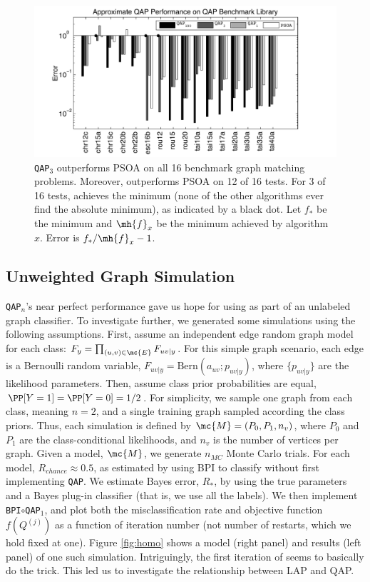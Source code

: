 \documentclass[10pt,journal,cspaper,compsoc]{IEEEtran}
\begin{document}
\begin{figure}[htbp]
	\centering			
	\includegraphics[width=1.0\linewidth]{../figs/benchmarks.pdf}
	\caption{\texttt{QAP}$_3$ outperforms PSOA on all 16 benchmark graph matching problems.  Moreover, \qapa outperforms PSOA on 12 of 16 tests.  For 3 of 16 tests, \qapb achieves the minimum (none of the other algorithms ever find the absolute minimum), as indicated by a black dot.  Let $f_*$ be the minimum and $\mh{f}_x$ be the minimum achieved by algorithm $x$.  Error is $f_*/\mh{f}_x-1$.  }
	\label{fig:fwpath}
\end{figure}




\subsection{Unweighted Graph Simulation}

\texttt{QAP}$_n$'s near perfect performance gave us hope for using \qap as part of an unlabeled graph classifier.  To investigate further, we generated some simulations using the following assumptions.  First, assume an independent edge random graph model for each class: $F_y=\prod_{(u,v) \in \mc{E}} F_{uv|y}$.  For this simple graph scenario, each edge is a Bernoulli random variable, $F_{uv|y}=\text{Bern}(a_{uv}; p_{uv|y})$, where $\{p_{uv|y}\}$ are the likelihood parameters.  Then, assume class prior probabilities are equal, $\PP[Y=1]=\PP[Y=0]=1/2$.  For simplicity, we sample one graph from each class, meaning $n=2$, and a single training graph sampled according the class priors. Thus, each simulation is defined by $\mc{M}=(P_0,P_1,n_v)$, where $P_0$ and $P_1$ are the class-conditional likelihoods, and $n_v$ is the number of vertices per graph.  Given a model, $\mc{M}$, we generate $n_{MC}$ Monte Carlo trials.  For each model, $R_{chance}\approx 0.5$, as estimated by using BPI to classify without first implementing \texttt{QAP}.  We estimate Bayes error, $R_*$, by using the true parameters and a Bayes plug-in classifier (that is, we use all the labels).  We then implement \texttt{BPI}$\circ$\texttt{QAP}$_1$, and plot both the misclassification rate and objective function $f(Q^{(j)})$ as a function of iteration number (not number of restarts, which we hold fixed at one). Figure \ref{fig:homo} shows a model (right panel) and results (left panel) of one such simulation. Intriguingly, the first iteration of \qapa seems to basically do the trick.  This led us to investigate the relationship between LAP and QAP.
\end{document}
